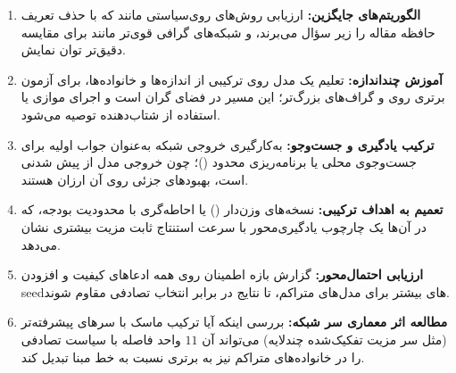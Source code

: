 \begin{enumerate}
  \item \textbf{الگوریتم‌های جایگزین:} ارزیابی روش‌های روی‌سیاستی مانند
         که با حذف  تعریف حافظه مقاله را زیر سؤال
        می‌برند، و شبکه‌های گرافی قوی‌تر مانند  برای مقایسه دقیق‌تر
        توان نمایش.
  \item \textbf{آموزش چند‌اندازه:} تعلیم یک مدل روی ترکیبی از اندازه‌ها و
        خانواده‌ها، برای آزمون برتری روی  و گراف‌های بزرگ‌تر؛ این مسیر
        در فضای  گران است و اجرای موازی یا استفاده از شتاب‌دهنده
        توصیه می‌شود.
  \item \textbf{ترکیب یادگیری و جست‌وجو:} به‌کارگیری خروجی شبکه به‌عنوان جواب
        اولیه برای جست‌وجوی محلی یا برنامه‌ریزی محدود ()؛ چون
        خروجی مدل از پیش شدنی است، بهبودهای جزئی روی آن ارزان هستند.
  \item \textbf{تعمیم به اهداف ترکیبی:} نسخه‌های وزن‌دار ()
        یا احاطه‌گری با محدودیت بودجه، که در آن‌ها یک چارچوب یادگیری‌محور با
        سرعت استنتاج ثابت مزیت بیشتری نشان می‌دهد.
  \item \textbf{ارزیابی احتمال‌محور:} گزارش بازه اطمینان روی همه ادعاهای کیفیت
        و افزودن seedهای بیشتر برای مدل‌های متراکم، تا نتایج در برابر انتخاب
        تصادفی مقاوم شوند.
  \item \textbf{مطالعه اثر معماری سر شبکه:} بررسی اینکه آیا ترکیب ماسک
         با سرهای پیشرفته‌تر (مثل سر مزیت تفکیک‌شده چند‌لایه) می‌تواند
        آن $11$ واحد فاصله با سیاست تصادفی را در خانواده‌های متراکم نیز به
        برتری نسبت به خط مبنا تبدیل کند.
\end{enumerate}

